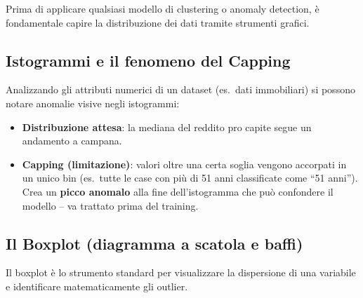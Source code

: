 Prima di applicare qualsiasi modello di clustering o anomaly detection, è fondamentale capire la distribuzione dei dati tramite strumenti grafici.

\subsection{Istogrammi e il fenomeno del Capping}

Analizzando gli attributi numerici di un dataset (es.\ dati immobiliari) si possono notare anomalie visive negli istogrammi:

\begin{itemize}
    \item \textbf{Distribuzione attesa}: la mediana del reddito pro capite segue un andamento a campana.
    \item \textbf{Capping (limitazione)}: valori oltre una certa soglia vengono accorpati in un unico bin (es.\ tutte le case con più di 51 anni classificate come ``51 anni''). Crea un \textbf{picco anomalo} alla fine dell'istogramma che può confondere il modello -- va trattato prima del training.
\end{itemize}

\subsection{Il Boxplot (diagramma a scatola e baffi)}

Il boxplot è lo strumento standard per visualizzare la dispersione di una variabile e identificare matematicamente gli outlier.

\begin{center}
\end{center}

